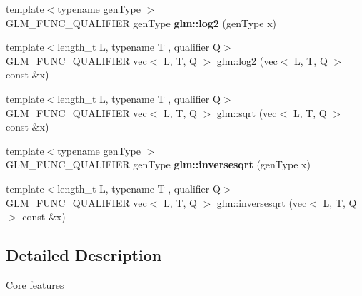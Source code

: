\begin{DoxyCompactItemize}
{\footnotesize template$<$typename gen\+Type $>$ }\\G\+L\+M\+\_\+\+F\+U\+N\+C\+\_\+\+Q\+U\+A\+L\+I\+F\+I\+ER gen\+Type {\bfseries glm\+::log2} (gen\+Type x)
\item 
{\footnotesize template$<$length\+\_\+t L, typename T , qualifier Q$>$ }\\G\+L\+M\+\_\+\+F\+U\+N\+C\+\_\+\+Q\+U\+A\+L\+I\+F\+I\+ER vec$<$ L, T, Q $>$ \hyperlink{group__core__func__exponential_ga82831c7d9cca777cebedfe03a19c8d75}{glm\+::log2} (vec$<$ L, T, Q $>$ const \&x)
\item 
{\footnotesize template$<$length\+\_\+t L, typename T , qualifier Q$>$ }\\G\+L\+M\+\_\+\+F\+U\+N\+C\+\_\+\+Q\+U\+A\+L\+I\+F\+I\+ER vec$<$ L, T, Q $>$ \hyperlink{group__core__func__exponential_gaa83e5f1648b7ccdf33b87c07c76cb77c}{glm\+::sqrt} (vec$<$ L, T, Q $>$ const \&x)
\item 
\mbox{\label{func__exponential_8inl_a5e3dd2bba414db15477d43ca9d71acf5}} 
{\footnotesize template$<$typename gen\+Type $>$ }\\G\+L\+M\+\_\+\+F\+U\+N\+C\+\_\+\+Q\+U\+A\+L\+I\+F\+I\+ER gen\+Type {\bfseries glm\+::inversesqrt} (gen\+Type x)
\item 
{\footnotesize template$<$length\+\_\+t L, typename T , qualifier Q$>$ }\\G\+L\+M\+\_\+\+F\+U\+N\+C\+\_\+\+Q\+U\+A\+L\+I\+F\+I\+ER vec$<$ L, T, Q $>$ \hyperlink{group__core__func__exponential_ga523dd6bd0ad9f75ae2d24c8e4b017b7a}{glm\+::inversesqrt} (vec$<$ L, T, Q $>$ const \&x)
\end{DoxyCompactItemize}


\subsection{Detailed Description}
\hyperlink{group__core}{Core features} 